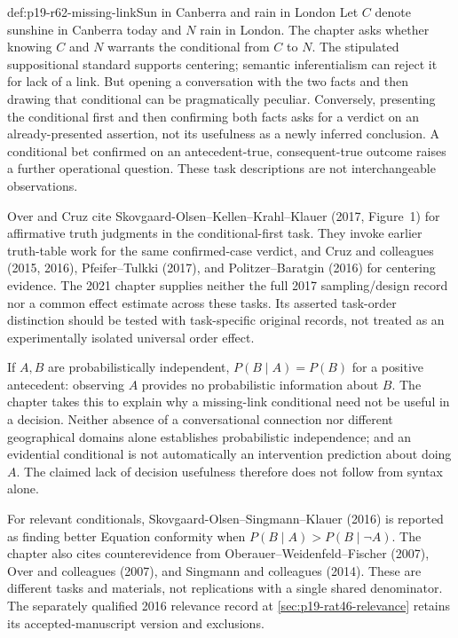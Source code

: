 \begin{hbexample}{def:p19-r62-missing-link}{Sun in Canberra and rain in London}
Let \(C\) denote sunshine in Canberra today and \(N\) rain in London.
The chapter asks whether knowing \(C\) and \(N\) warrants the conditional
from \(C\) to \(N\). The stipulated suppositional standard supports
centering; semantic inferentialism can reject it for lack of a link.
But opening a conversation with the two facts and then drawing that
conditional can be pragmatically peculiar. Conversely, presenting the
conditional first and then confirming both facts asks for a verdict on
an already-presented assertion, not its usefulness as a newly inferred
conclusion. A conditional bet confirmed on an antecedent-true,
consequent-true outcome raises a further operational question.
These task descriptions are not interchangeable observations.
\end{hbexample}

Over and Cruz cite Skovgaard-Olsen--Kellen--Krahl--Klauer (2017,
Figure~1) for affirmative truth judgments in the conditional-first task.
They invoke earlier truth-table work for the same confirmed-case verdict,
and Cruz and colleagues (2015, 2016), Pfeifer--Tulkki (2017), and
Politzer--Baratgin (2016) for centering evidence. The 2021 chapter supplies
neither the full 2017 sampling/design record nor a common effect estimate
across these tasks. Its asserted task-order distinction should be tested
with task-specific original records, not treated as an experimentally
isolated universal order effect.

If \(A,B\) are probabilistically independent, \(P(B\mid A)=P(B)\)
for a positive antecedent: observing \(A\) provides no probabilistic
information about \(B\). The chapter takes this to explain why a
missing-link conditional need not be useful in a decision. Neither
absence of a conversational connection nor different geographical domains
alone establishes probabilistic independence; and an evidential
conditional is not automatically an intervention prediction about doing
\(A\). The claimed lack of decision usefulness therefore does not
follow from syntax alone.

For relevant conditionals, Skovgaard-Olsen--Singmann--Klauer (2016) is
reported as finding better Equation conformity when \(P(B\mid A)>
P(B\mid\neg A)\). The chapter also cites counterevidence from
Oberauer--Weidenfeld--Fischer (2007), Over and colleagues (2007), and
Singmann and colleagues (2014). These are different tasks and materials,
not replications with a single shared denominator. The separately qualified
2016 relevance record at \cref{sec:p19-rat46-relevance} retains its
accepted-manuscript version and exclusions.

